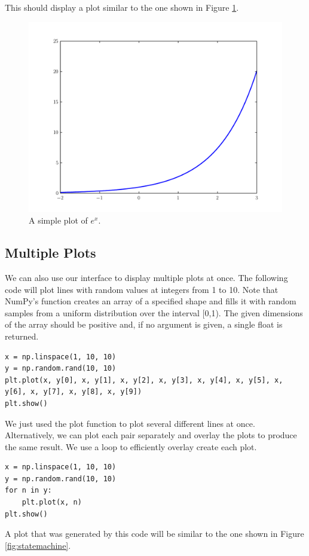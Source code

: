 This should display a plot similar to the one shown in Figure \ref{fig:exp_plot}.

\begin{figure}
\includegraphics[width=\textwidth]{exp_plot.pdf}
\caption{A simple plot of $e^x$.}
\label{fig:exp_plot}
\end{figure}


\subsection*{Multiple Plots}
We can also use our interface to display multiple plots at once.
The following code will plot lines with random values at integers from 1 to 10.
Note that NumPy's  function creates an array of a specified shape and fills it with random samples from a uniform distribution over the interval [0,1).
The given dimensions of the array should be positive and, if no argument is given, a single float is returned.

\begin{lstlisting}
x = np.linspace(1, 10, 10)
y = np.random.rand(10, 10)
plt.plot(x, y[0], x, y[1], x, y[2], x, y[3], x, y[4], x, y[5], x, y[6], x, y[7], x, y[8], x, y[9])
plt.show()
\end{lstlisting}

We just used the plot function to plot several different lines at once.
Alternatively, we can plot each  pair separately and overlay the plots to produce the same result.
We use a loop to efficiently overlay create each plot.
\begin{lstlisting}
x = np.linspace(1, 10, 10)
y = np.random.rand(10, 10)
for n in y:
    plt.plot(x, n)
plt.show()
\end{lstlisting}
A plot that was generated by this code will be similar to the one shown
in Figure \ref{fig:statemachine}.


